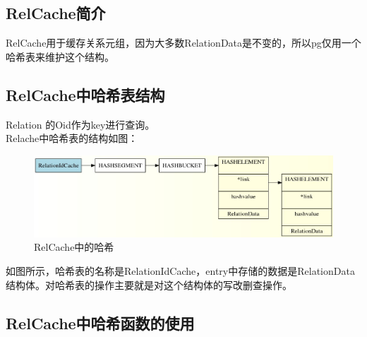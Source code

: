 \documentclass{article}
\begin{document}
\begin{CJK*}{UTF8}{gkai}
\subsection{RelCache简介}
\indent RelCache用于缓存关系元组，因为大多数RelationData是不变的，所以pg仅用一个哈希表来维护这个结构。
\subsection{RelCache中哈希表结构}

\indent Relation 的Oid作为key进行查询。\\
\indent Relache中哈希表的结构如图：

\begin{figure}[H] 
\centering
\includegraphics[width = \textwidth]{rel.jpg}
\caption{RelCache中的哈希}
\label{overflow}
\end{figure}

\indent   如图所示，哈希表的名称是RelationIdCache，entry中存储的数据是RelationData结构体。对哈希表的操作主要就是对这个结构体的写改删查操作。


\subsection{RelCache中哈希函数的使用}

\begin{table}[H] 
\centering


\end{table}
\end{CJK*}
\end{document}
